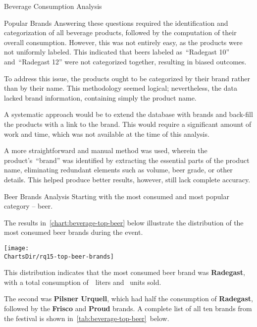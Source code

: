 \begin{section}{Beverage Consumption Analysis}
\begin{subsection}{Popular Brands}
		Answering these questions required the identification and categorization of all beverage products, followed by the computation of their overall consumption.
		However, this was not entirely easy, as the products were not uniformly labeled.
		This indicated that beers labeled as~\enquote{Radegast 10} and~\enquote{Radegast 12} were not categorized together, resulting in biased outcomes.

		To address this issue, the products ought to be categorized by their brand rather than by their name.
		This methodology seemed logical; nevertheless, the data lacked brand information, containing simply the product name.

		A systematic approach would be to extend the database with brands and back-fill the products with a link to the brand.
		This would require a significant amount of work and time, which was not available at the time of this analysis.

		A more straightforward and manual method was used, wherein the product's~\enquote{brand} was identified by extracting the essential parts of the product name, eliminating redundant elements such as volume, beer grade, or other details.
		This helped produce better results, however, still lack complete accuracy.

		\begin{subsubsection}{Beer Brands Analysis}
			\label{subsubsec:analysis-beverage-popular-beer}
			Starting with the most consumed and most popular category – beer.


			The results in~\autoref{chart:beverage-top-beer} below illustrate the distribution of the most consumed beer brands during the event.

			\begin{chart}[H]
				\centering
				\texttt{[image: \\ChartsDir/rq15-top-beer-brands]}
				\caption{ Most Consumed Beer Brands}
				\label{chart:beverage-top-beer}
				\source
			\end{chart}

			This distribution indicates that the most consumed beer brand was \textbf{Radegast}, with a total consumption of~~liters and~ units sold.

			The second was \textbf{Pilsner Urquell}, which had half the consumption of \textbf{Radegast}, followed by the \textbf{Frisco} and \textbf{Proud} brands.
			A complete list of all ten brands from the festival is shown in~\autoref{tab:beverage-top-beer}~below.


\end{subsubsection}
\end{subsection}
\end{section}
